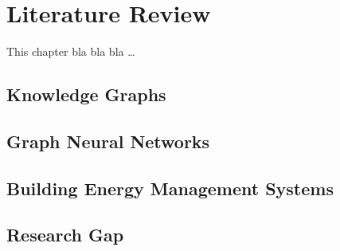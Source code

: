 \chapter{Literature Review}\label{chap:literature-review}
This chapter bla bla bla \ldots
\section{Knowledge Graphs}\label{sec:knowledge-graphs}

%
\section{Graph Neural Networks}\label{sec:graph-neural-networks}

%
\section{Building Energy Management Systems}\label{sec:building-energy-management-systems}

%
\section{Research Gap}\label{sec:research-gap}

